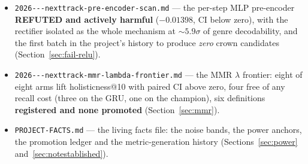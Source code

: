 \documentclass[11pt]{article}
\begin{document}
\begin{itemize}
  and~\ref{sec:metrics}).
  \item \texttt{2026---\allowbreak nexttrack-\allowbreak pre-\allowbreak encoder-\allowbreak scan.md} --- the per-step MLP
  pre-encoder \textbf{REFUTED and actively harmful} ($-\num{0.01398}$, CI below
  zero), with the rectifier isolated as the whole mechanism at
  ${\sim}\num{5.9}\sigma$ of genre decodability, and the first batch in the
  project's history to produce \emph{zero} crown candidates
  (Section~\ref{sec:fail-relu}).
  \item \texttt{2026---\allowbreak nexttrack-\allowbreak mmr-\allowbreak lambda-\allowbreak frontier.md} --- the MMR
  $\lambda$ frontier: eight of eight arms lift holisticness@10 with paired CI
  above zero, four free of any recall cost (three on the GRU, one on the
  champion), six definitions
  \textbf{registered and none promoted} (Section~\ref{sec:mmr}).
  \item \texttt{PROJECT-FACTS.md} --- the living facts file: the noise bands,
  the power anchors, the promotion ledger and the metric-generation history
  (Sections~\ref{sec:power} and~\ref{sec:notestablished}).
\end{itemize}
\end{document}
